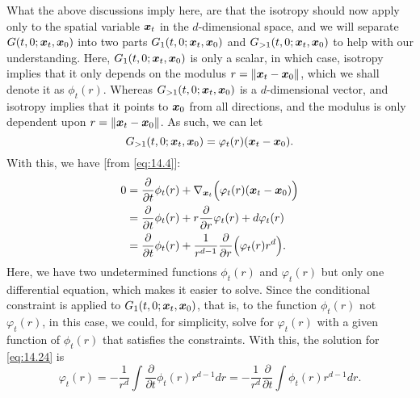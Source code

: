 What the above discussions imply here, are that the isotropy should now apply only to the spatial variable $\bm{x}_{t}$ in the $d$-dimensional space, and we will separate $G(t,0;\bm{x}_{t},\bm{x}_0)$ into two parts $G_1 (t,0;\bm{x}_{t},\bm{x}_0)$ and $G_{>1}(t,0;\bm{x}_{t},\bm{x}_0)$ to help with our understanding. Here, $G_1 (t,0;\bm{x}_{t},\bm{x}_0)$ is only a scalar, in which case, isotropy implies that it only depends on the modulus $r=\|\bm{x}_t-\bm{x}_0\|$, which we shall denote it as $\phi_t(r)$. Whereas $G_{>1}(t,0;\bm{x}_{t},\bm{x}_0)$ is a $d$-dimensional vector, and isotropy implies that it points to $\bm{x}_0$ from all directions, and the modulus is only dependent upon $r=\|\bm{x}_t-\bm{x}_0\|$. As such, we can let
\begin{equation}
    \label{eq:14.23}
G_{>1}(t,0;\bm{x}_{t},\bm{x}_0)=\varphi_t(r) (\bm{x}_{t}-\bm{x}_0).
\end{equation}
With this, we have [from \cref{eq:14.4}]:
\begin{align}
    0&=\frac{\partial}{\partial t}\phi_t(r) +\nabla_{\bm{x}_{t}}\Bigl(\varphi_t(r) (\bm{x}_{t}-\bm{x}_0)\Bigr)\nonumber\\
    &=\frac{\partial}{\partial t}\phi_t(r) + r\frac{\partial}{\partial r}\varphi_t (r)+d\varphi_t(r)\nonumber\\
    &=\frac{\partial}{\partial t}\phi_t(r) + \frac{1}{r^{d-1}}\frac{\partial}{\partial r} \Bigl(\varphi_t(r)r^d \Bigr).\label{eq:14.24}
\end{align}
Here, we have two undetermined functions $\phi_t(r)$ and $\varphi_t(r)$ but only one differential equation, which makes it easier to solve. Since the conditional constraint is applied to $G_1 (t,0;\bm{x}_{t},\bm{x}_0)$, that is, to the function $\phi_t(r)$ not $\varphi_t(r)$, in this case, we could, for simplicity, solve for $\varphi_t(r)$ with a given function of $\phi_t(r)$ that satisfies the constraints. With this, the solution for \cref{eq:14.24} is 
\begin{equation}
    \label{eq:14.25}
    \varphi_t(r) =-\frac{1}{r^d}\int\frac{\partial}{\partial t}\phi_t(r)r^{d-1}dr=-\frac{1}{r^d}\frac{\partial}{\partial t}\int \phi_t(r)r^{d-1}dr.
\end{equation}

